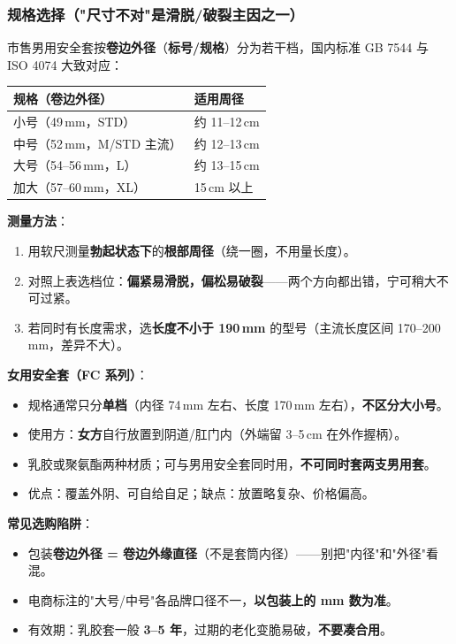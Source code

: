 \documentclass[12pt,UTF8,openany]{ctexbook}
\begin{document}
\subsubsection*{规格选择（"尺寸不对"是滑脱/破裂主因之一）}

市售男用安全套按\textbf{卷边外径}（\textbf{标号/规格}）分为若干档，国内标准 GB 7544 与 ISO 4074 大致对应：

\begin{center}
\footnotesize
\begin{tabularx}{\textwidth}{lX}
\toprule
\textbf{规格（卷边外径）} & \textbf{适用周径} \\
\midrule
小号（49\,mm，STD） & 约 11--12\,cm \\
中号（52\,mm，M/STD 主流） & 约 12--13\,cm \\
大号（54--56\,mm，L） & 约 13--15\,cm \\
加大（57--60\,mm，XL） & 15\,cm 以上 \\
\bottomrule
\end{tabularx}
\end{center}

\noindent \textbf{测量方法}：
\begin{enumerate}[leftmargin=2em,itemsep=0.3em]
  \item 用软尺测量\textbf{勃起状态下}的\textbf{根部周径}（绕一圈，不用量长度）。
  \item 对照上表选档位：\textbf{偏紧易滑脱，偏松易破裂}——两个方向都出错，宁可稍大不可过紧。
  \item 若同时有长度需求，选\textbf{长度不小于 190\,mm} 的型号（主流长度区间 170--200\,mm，差异不大）。
\end{enumerate}

\noindent \textbf{女用安全套（FC 系列）}：
\begin{itemize}[leftmargin=2em,itemsep=0.3em]
  \item 规格通常只分\textbf{单档}（内径 74\,mm 左右、长度 170\,mm 左右），\textbf{不区分大小号}。
  \item 使用方：\textbf{女方}自行放置到阴道/肛门内（外端留 3--5\,cm 在外作握柄）。
  \item 乳胶或聚氨酯两种材质；可与男用安全套同时用，\textbf{不可同时套两支男用套}。
  \item 优点：覆盖外阴、可自给自足；缺点：放置略复杂、价格偏高。
\end{itemize}

\noindent \textbf{常见选购陷阱}：
\begin{itemize}[leftmargin=2em,itemsep=0.3em]
  \item 包装\textbf{卷边外径 = 卷边外缘直径}（不是套筒内径）——别把"内径"和"外径"看混。
  \item 电商标注的"大号/中号"各品牌口径不一，\textbf{以包装上的 mm 数为准}。
  \item 有效期：乳胶套一般 \textbf{3--5 年}，过期的老化变脆易破，\textbf{不要凑合用}。
\end{itemize}
\end{document}
